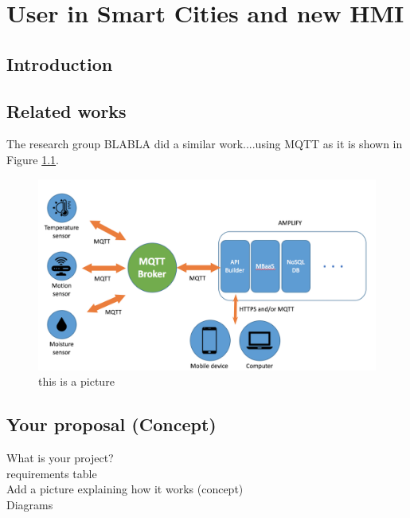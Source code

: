\chapter{User in Smart Cities and new HMI}
\label{intro} 



\section{Introduction}
\label{sec:1}


\section{Related works}
\label{sec:2}

The research group BLABLA \cite{cheng2015building} did a similar work....using MQTT as it is shown in Figure \ref{fig:1}.
\begin{figure}
\sidecaption
\includegraphics[scale=.09]{images/figure.png}
\caption{this is a picture}
\label{fig:1}
\end{figure}


\section{Your proposal (Concept)}
\label{sec:3}
   What is your project?
\\ requirements table
\\ Add a picture explaining how it works (concept)
\\ Diagrams
\\

